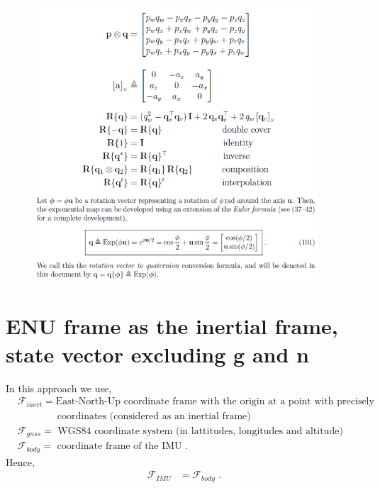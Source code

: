 \documentclass{article}
\begin{document}
\begin{figure}[htp]
    \centering
    \includegraphics[width=300pt]{quaternion-operations.png}
    \caption{}
    \label{fig-quaternion-operations}
\end{figure}








\section{ENU frame as the inertial frame, state vector excluding \textbf{g} and \textbf{n}}

In this approach we use,
\begin{align}
    &\mathcal{F}_{inert}=\text{East-North-Up coordinate frame with the origin at a point with precisely known GNSS} \nonumber \\
    &\quad \quad \quad  \quad \text{coordinates (considered as an inertial frame)} \nonumber \\
    &\mathcal{F}_{gnss}=\text{ WGS84 coordinate system (in lattitudes, longitudes and altitude)} \nonumber \\
    &\mathcal{F}_{body}=\text{ coordinate frame of the IMU} \text{ .}
\end{align}{}
Hence,
\begin{align}
    \mathcal{F}_{IMU}&=\mathcal{F}_{body} \text{ .}
\end{align}{}
\end{document}
